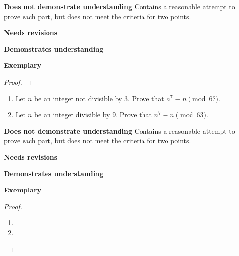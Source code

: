 \documentclass[letterpaper, 11pt]{../ximera}
\begin{document}
\begin{writeRubric}
    \item \textbf{Does not demonstrate understanding}
     Contains a reasonable attempt to prove each part, but does not meet the criteria for two points.
    \item \textbf{Needs revisions}
     
    \item \textbf{Demonstrates understanding}
    
    \item \textbf{Exemplary}
        
\end{writeRubric}
                                       \begin{proof}
 
\end{proof}

\begin{ex} 
	\begin{enumerate}[label=(\alph*)]
 		\item Let $n$ be an integer not divisible by $3$. Prove that $n^7\equiv n\pmod{63}$.
		\item Let $n$ be an integer divisible by $9$. Prove that $n^7\equiv n \pmod{63}$.
	\end{enumerate}
\end{ex}

\begin{writeRubric}
    \item \textbf{Does not demonstrate understanding}
     Contains a reasonable attempt to prove each part, but does not meet the criteria for two points.
    \item \textbf{Needs revisions}
     
    \item \textbf{Demonstrates understanding}
    
    \item \textbf{Exemplary}
        
\end{writeRubric}
                                       \begin{proof}
	\begin{enumerate}[label=(\alph*)]
 		\item 
		\item 
	\end{enumerate} 
\end{proof}
\end{document}
